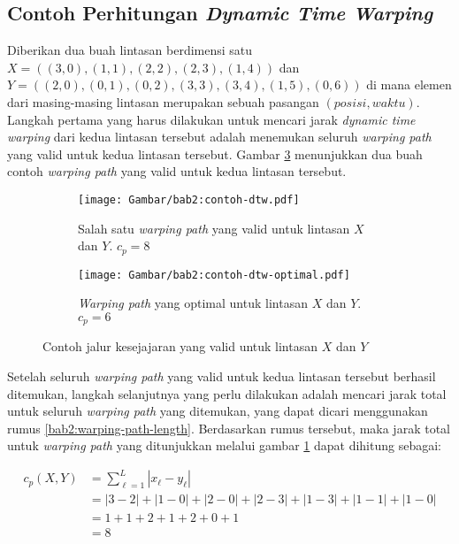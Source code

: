 \subsection{Contoh Perhitungan \textit{Dynamic Time Warping}}
\label{subsec:contoh-dtw}

Diberikan dua buah lintasan berdimensi satu $X = ((3, 0), (1, 1), (2, 2), (2, 3), (1, 4))$ dan $Y = ((2, 0), (0, 1), (0, 2), (3, 3), (3, 4), (1, 5), (0, 6))$ di mana elemen dari masing-masing lintasan merupakan sebuah pasangan $(posisi, waktu)$. Langkah pertama yang harus dilakukan untuk mencari jarak \textit{dynamic time warping} dari kedua lintasan tersebut adalah menemukan seluruh \textit{warping path} yang valid untuk kedua lintasan tersebut. Gambar \ref{bab2:contoh-dtw} menunjukkan dua buah contoh \textit{warping path} yang valid untuk kedua lintasan tersebut.

\begin{figure}[h]
    \centering
    \begin{subfigure}{0.25\textwidth}
        \centering
        \texttt{[image: Gambar/bab2:contoh-dtw.pdf]}
        \caption{Salah satu \textit{warping path} yang valid untuk lintasan $X$ dan $Y$. $c_p = 8$}
        \label{bab2:warping-path}
    \end{subfigure} \hspace{1cm}
    \begin{subfigure}{0.25\textwidth}
        \centering
        \texttt{[image: Gambar/bab2:contoh-dtw-optimal.pdf]}
        \caption{\textit{Warping path} yang optimal untuk lintasan $X$ dan $Y$. $c_p = 6$}
        \label{bab2:warping-path-optimal}
    \end{subfigure}
    \caption{Contoh jalur kesejajaran yang valid untuk lintasan $X$ dan $Y$}
    \label{bab2:contoh-dtw}
\end{figure}

Setelah seluruh \textit{warping path} yang valid untuk kedua lintasan tersebut berhasil ditemukan, langkah selanjutnya yang perlu dilakukan adalah mencari jarak total untuk seluruh \textit{warping path} yang ditemukan, yang dapat dicari menggunakan rumus \ref{bab2:warping-path-length}. Berdasarkan rumus tersebut, maka jarak total untuk \textit{warping path} yang ditunjukkan melalui gambar \ref{bab2:warping-path} dapat dihitung sebagai:

\begin{align*}
    c_p(X, Y) & = \sum_{\ell = 1}^{L} |x_\ell - y_\ell| \\
    & = |3 - 2| + |1 - 0| + |2 - 0| + |2 - 3| + |1 - 3| + |1 - 1| + |1 - 0| \\
    & = 1 + 1 + 2 + 1 + 2 + 0 + 1 \\
    & = 8
\end{align*}

